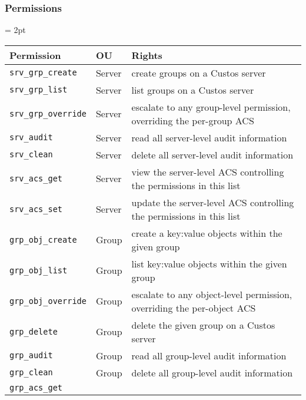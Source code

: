 \subsubsection{Permissions}
\label{chap:custos:arch:ac:perms}

\begin{table}[!thb]
  \footnotesize
  \centering
  \tabulinesep = 2pt
  \begin{tabu} to \textwidth
    { | X[1.25,l,m]
      | X[.5,l,m]
      | X[4,l,m]
      | }
    \hline
    \textbf{Permission}
    & \textbf{OU}
    & \textbf{Rights}
    \\ \hline
    \texttt{srv\_grp\_create}
    & Server
    & create groups on a Custos server
    \\ \hline
    \texttt{srv\_grp\_list}
    & Server
    & list groups on a Custos server
    \\ \hline
    \texttt{srv\_grp\_override}
    & Server
    & escalate to any group-level permission, overriding the per-group ACS
    \\ \hline
    \texttt{srv\_audit}
    & Server
    & read all server-level audit information
    \\ \hline
    \texttt{srv\_clean}
    & Server
    & delete all server-level audit information
    \\ \hline
    \texttt{srv\_acs\_get}
    & Server
    & view the server-level ACS controlling the permissions in this list
    \\ \hline
    \texttt{srv\_acs\_set}
    & Server
    & update the server-level ACS controlling the permissions in this list
    \\ \hline
    \texttt{grp\_obj\_create}
    & Group
    & create a key:value objects within the given group
    \\ \hline
    \texttt{grp\_obj\_list}
    & Group
    & list key:value objects within the given group
    \\ \hline
    \texttt{grp\_obj\_override}
    & Group
    & escalate to any object-level permission, overriding the per-object ACS
    \\ \hline
    \texttt{grp\_delete}
    & Group
    & delete the given group on a Custos server
    \\ \hline
    \texttt{grp\_audit}
    & Group
    & read all group-level audit information
    \\ \hline
    \texttt{grp\_clean}
    & Group
    & delete all group-level audit information
    \\ \hline
    \texttt{grp\_acs\_get}

\end{tabu}
\end{table}
